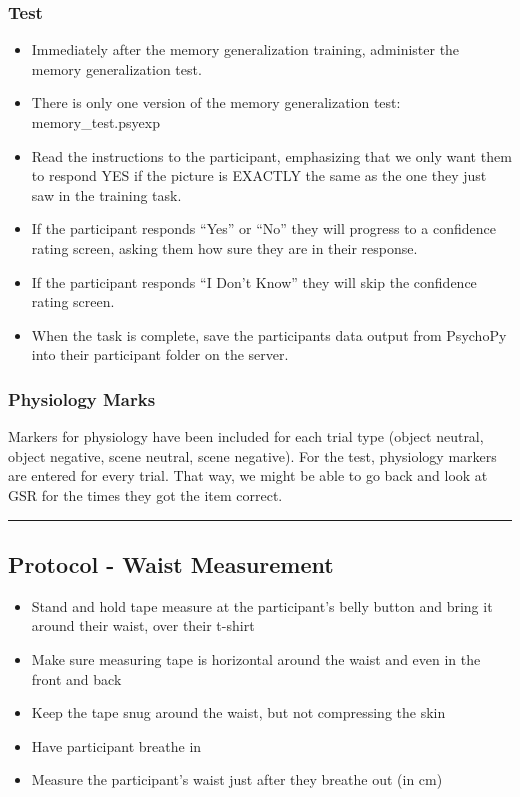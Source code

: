 \documentclass[]{book}
\providecommand{\tightlist}{%
  \setlength{\itemsep}{0pt}\setlength{\parskip}{0pt}}
\begin{document}
\hypertarget{test}{%
\subsubsection{Test}\label{test}}

\begin{itemize}
\tightlist
\item
  Immediately after the memory generalization training, administer the memory generalization test.
\item
  There is only one version of the memory generalization test: memory\_test.psyexp
\item
  Read the instructions to the participant, emphasizing that we only want them to respond YES if the picture is EXACTLY the same as the one they just saw in the training task.
\item
  If the participant responds ``Yes'' or ``No'' they will progress to a confidence rating screen, asking them how sure they are in their response.
\item
  If the participant responds ``I Don't Know'' they will skip the confidence rating screen.
\item
  When the task is complete, save the participants data output from PsychoPy into their participant folder on the server.
\end{itemize}

\hypertarget{physiology-marks}{%
\subsubsection{Physiology Marks}\label{physiology-marks}}

Markers for physiology have been included for each trial type (object neutral, object negative, scene neutral, scene negative). For the test, physiology markers are entered for every trial. That way, we might be able to go back and look at GSR for the times they got the item correct.

\begin{center}\rule{0.5\linewidth}{0.5pt}\end{center}

\hypertarget{protocol---waist-measurement}{%
\subsection{Protocol - Waist Measurement}\label{protocol---waist-measurement}}

\begin{itemize}
\tightlist
\item
  Stand and hold tape measure at the participant's belly button and bring it around their waist, over their t-shirt
\item
  Make sure measuring tape is horizontal around the waist and even in the front and back
\item
  Keep the tape snug around the waist, but not compressing the skin
\item
  Have participant breathe in
\item
  Measure the participant's waist just after they breathe out (in cm)
\end{itemize}
\end{document}
